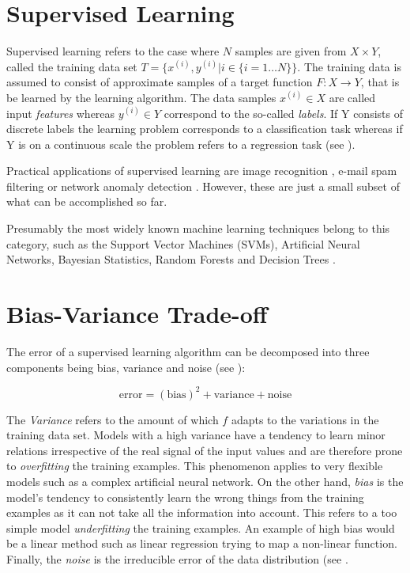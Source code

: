 \section{Supervised Learning}

Supervised learning refers to the case where $N$ samples are given from $X \times Y$, called the training data set  $T = \{ x^{(i)}, y^{(i)} | i \in \{i=1 \dots N\} \}$. The training data is assumed to consist of approximate samples of a target function $F: X \rightarrow Y$, that is be learned by the learning algorithm. The data samples $x^{(i)} \in X$ are called input \textit{features} whereas $y^{(i)} \in Y$ correspond to the so-called \textit{labels}. If Y consists of discrete labels the learning problem corresponds to a classification task whereas if Y is on a continuous scale the problem refers to a regression task (see \cite{Marsland:2009:MLA:1571643}).

Practical applications of supervised learning are image recognition \cite{simonyan2014very, lecun1990handwritten}, e-mail spam filtering \cite{guzella2009review} or network anomaly detection \cite{lee2010uncovering}. However, these are just a small subset of what can be accomplished so far.

Presumably the most widely known machine learning techniques belong to this category, such as the Support Vector Machines (SVMs), Artificial Neural Networks, Bayesian Statistics, Random Forests and Decision Trees \cite{Duda:2000:PC:954544}.

\section{Bias-Variance Trade-off}
The error of a supervised learning algorithm can be decomposed into three components being bias, variance and noise (see \cite{efron_hastie_2016}):

\begin{equation}
  \text{error} = (\text{bias})^2 + \text{variance} + \text{noise}
\end{equation}

The \textit{Variance} refers to the amount of which $f$ adapts to the variations in the training data set. Models with a high variance have a tendency to learn minor relations irrespective of the real signal of the input values and are therefore prone to \textit{overfitting} the training examples. This phenomenon applies to very flexible models such as a complex artificial neural network. On the other hand, \textit{bias} is the model's tendency to consistently learn the wrong things from the training examples as it can not take all the information into account. This refers to a too simple model \textit{underfitting} the training examples. An example of high bias would be a linear method such as linear regression trying to map a non-linear function. Finally, the \textit{noise} is the irreducible error of the data distribution (see \cite{James:2014:ISL:2517747}.

